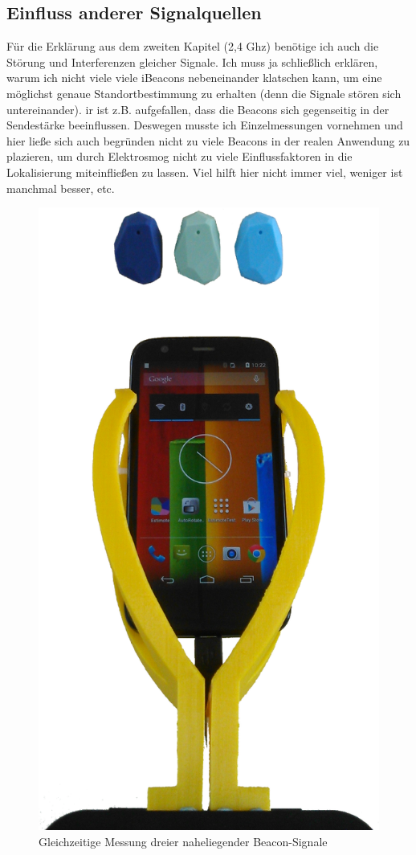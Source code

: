 \subsection{Einfluss anderer Signalquellen} 
Für die Erklärung aus dem zweiten Kapitel (2,4 Ghz) benötige ich auch die Störung und Interferenzen gleicher Signale. Ich muss ja schließlich erklären, warum ich nicht viele viele iBeacons nebeneinander klatschen kann, um eine möglichst genaue Standortbestimmung zu erhalten (denn die Signale stören sich untereinander). 
ir ist z.B. aufgefallen, dass die Beacons sich gegenseitig in der Sendestärke beeinflussen. Deswegen musste ich Einzelmessungen vornehmen und hier ließe sich auch begründen nicht zu viele Beacons in der realen Anwendung zu plazieren, um durch Elektrosmog nicht zu viele Einflussfaktoren in die Lokalisierung miteinfließen zu lassen. Viel hilft hier nicht immer viel, weniger ist manchmal besser, etc.
\begin{figure}[H] 
\centering
\includegraphics[scale=0.3]{Bilder/MessungBeacon3}
\caption{Gleichzeitige Messung dreier naheliegender Beacon-Signale}
\end{figure}